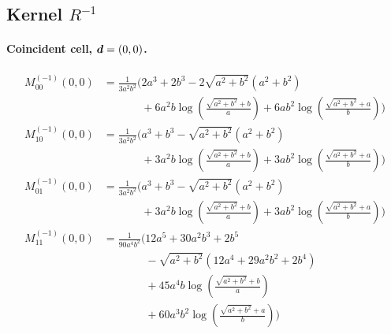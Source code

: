 \subsection*{Kernel $R^{-1}$}
\paragraph{Coincident cell, $\vb*{d}=(0,0)$.}
\begin{align*}
M^{(-1)}_{00}(0,0) &= \frac{1}{3 a^{2} b^{2}}\Bigg(2 a^{3} + 2 b^{3} - 2 \sqrt{a^{2} + b^{2}}\left(a^{2} + b^{2}\right)\\
&\phantom{{}=\frac{1}{3 a^{2} b^{2}}\Bigg(}+ 6 a^{2} b \log\left(\frac{\sqrt{a^{2} + b^{2}} + b}{a}\right) + 6 a b^{2} \log\left(\frac{\sqrt{a^{2} + b^{2}} + a}{b}\right)\Bigg)\\[1.2ex]
M^{(-1)}_{10}(0,0) &= \frac{1}{3 a^{2} b^{2}}\Bigg(a^{3} + b^{3} - \sqrt{a^{2} + b^{2}}\left(a^{2} + b^{2}\right)\\
&\phantom{{}=\frac{1}{3 a^{2} b^{2}}\Bigg(}+ 3 a^{2} b \log\left(\frac{\sqrt{a^{2} + b^{2}} + b}{a}\right) + 3 a b^{2} \log\left(\frac{\sqrt{a^{2} + b^{2}} + a}{b}\right)\Bigg)\\[1.2ex]
M^{(-1)}_{01}(0,0) &= \frac{1}{3 a^{2} b^{2}}\Bigg(a^{3} + b^{3} - \sqrt{a^{2} + b^{2}}\left(a^{2} + b^{2}\right)\\
&\phantom{{}=\frac{1}{3 a^{2} b^{2}}\Bigg(}+ 3 a^{2} b \log\left(\frac{\sqrt{a^{2} + b^{2}} + b}{a}\right) + 3 a b^{2} \log\left(\frac{\sqrt{a^{2} + b^{2}} + a}{b}\right)\Bigg)\\[1.2ex]
M^{(-1)}_{11}(0,0) &= \frac{1}{90 a^{4} b^{2}}\Bigg(12 a^{5} + 30 a^{2} b^{3} + 2 b^{5}\\
&\phantom{{}=\frac{1}{90 a^{4} b^{2}}\Bigg(}- \sqrt{a^{2} + b^{2}}\left(12 a^{4} + 29 a^{2} b^{2} + 2 b^{4}\right)\\
&\phantom{{}=\frac{1}{90 a^{4} b^{2}}\Bigg(}+ 45 a^{4} b \log\left(\frac{\sqrt{a^{2} + b^{2}} + b}{a}\right)\\
&\phantom{{}=\frac{1}{90 a^{4} b^{2}}\Bigg(}+ 60 a^{3} b^{2} \log\left(\frac{\sqrt{a^{2} + b^{2}} + a}{b}\right)\Bigg)
\end{align*}
